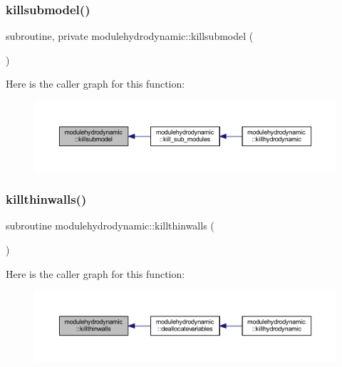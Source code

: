 \subsubsection{\texorpdfstring{killsubmodel()}{killsubmodel()}}
{\footnotesize\ttfamily subroutine, private modulehydrodynamic\+::killsubmodel (\begin{DoxyParamCaption}{ }\end{DoxyParamCaption})\hspace{0.3cm}{\ttfamily [private]}}

Here is the caller graph for this function\+:\nopagebreak
\begin{figure}[H]
\begin{center}
\leavevmode
\includegraphics[width=350pt]{namespacemodulehydrodynamic_a9b2046e58cfbfc36752c1c596ac76085_icgraph}
\end{center}
\end{figure}
\mbox{\label{namespacemodulehydrodynamic_a93dc7bf3dc53936a78e774fea543f5d9}} 
\subsubsection{\texorpdfstring{killthinwalls()}{killthinwalls()}}
{\footnotesize\ttfamily subroutine modulehydrodynamic\+::killthinwalls (\begin{DoxyParamCaption}{ }\end{DoxyParamCaption})\hspace{0.3cm}{\ttfamily [private]}}

Here is the caller graph for this function\+:\nopagebreak
\begin{figure}[H]
\begin{center}
\leavevmode
\includegraphics[width=350pt]{namespacemodulehydrodynamic_a93dc7bf3dc53936a78e774fea543f5d9_icgraph}
\end{center}
\end{figure}
\mbox{\label{namespacemodulehydrodynamic_ab35b45e7f241087188692a17e57b81fe}} 
